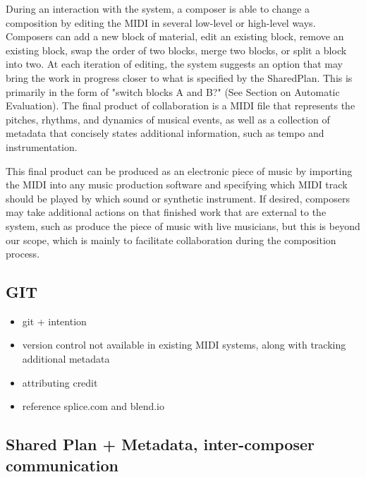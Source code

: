 \documentclass[final,authoryear,5p,times,twocolumn]{elsarticle}
\begin{document}
During an interaction with the system, a composer is able to change a composition by editing the MIDI in several low-level or high-level ways. Composers can add a new block of material, edit an existing block, remove an existing block, swap the order of two blocks, merge two blocks, or split a block into two. At each iteration of editing, the system suggests an option that may bring the work in progress closer to what is specified by the SharedPlan. This is primarily in the form of "switch blocks A and B?" (See Section on Automatic Evaluation). The final product of collaboration is a MIDI file that represents the pitches, rhythms, and dynamics of musical events, as well as a collection of metadata that concisely states additional information, such as tempo and instrumentation. 

This final product can be produced as an electronic piece of music by importing the MIDI into any music production software and specifying which MIDI track should be played by which sound or synthetic instrument. If desired, composers may take additional actions on that finished work that are external to the system, such as produce the piece of music with live musicians, but this is beyond our scope, which is mainly to facilitate collaboration during the composition process.

\subsection{GIT}


\begin{itemize}

\item git + intention

\item version control not available in existing MIDI systems, along with tracking additional metadata

\item attributing credit

\item reference splice.com and blend.io

\end{itemize}


\subsection{Shared Plan + Metadata, inter-composer communication}
\end{document}
